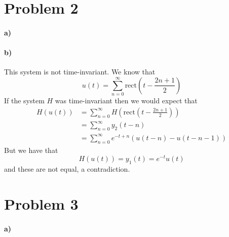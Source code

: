 \documentclass[12pt]{article}
\begin{document}
\section*{Problem 2}

\paragraph{a)}

\begin{center}
    \end{center}

\paragraph{b)}

This system is not time-invariant. We know that
\[u(t)=\sum_{n=0}^\infty \text{rect}\left(t-\frac{2n+1}{2}\right)\]
If the system \(H\) was time-invariant then we would expect that
\begin{align*}
    H(u(t))&=\sum_{n=0}^\infty H\left(\text{rect}\left(t-\frac{2n+1}{2}\right)\right)\\
    &=\sum_{n=0}^\infty y_2(t-n)\\
    &=\sum_{n=0}^\infty e^{-t+n}(u(t-n)-u(t-n-1))
\end{align*}
But we have that
\[H(u(t))=y_1(t)=e^{-t}u(t)\]
and these are not equal, a contradiction.

\section*{Problem 3}

\paragraph{a)}
\end{document}
